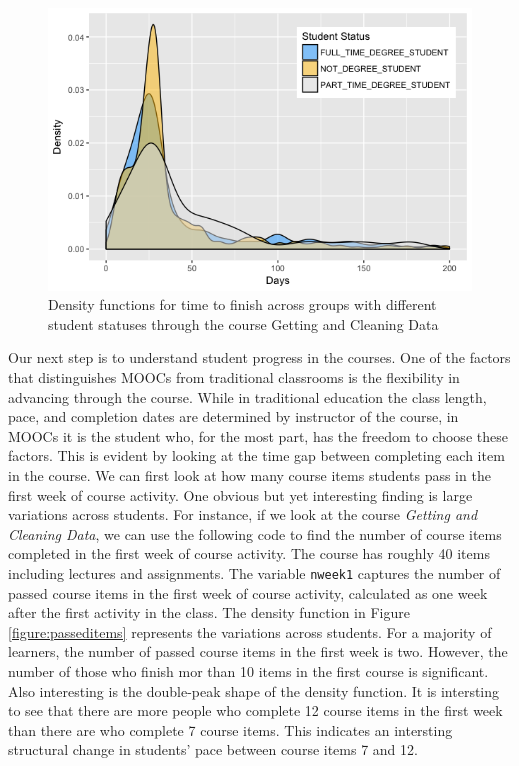 \begin{figure}[htbp]
    \centering
    \includegraphics[scale=0.5]{stustatus}
    \caption{Density functions for time to finish across groups with different student statuses through the course Getting and Cleaning Data}
    \label{figure:stustatus}
\end{figure}

Our next step is to understand student progress in the courses. One of
the factors that distinguishes MOOCs from traditional classrooms is the
flexibility in advancing through the course. While in traditional
education the class length, pace, and completion dates are determined by
instructor of the course, in MOOCs it is the student who, for the most
part, has the freedom to choose these factors. This is evident by
looking at the time gap between completing each item in the course. We
can first look at how many course items students pass in the first week
of course activity. One obvious but yet interesting finding is large
variations across students. For instance, if we look at the course
\emph{Getting and Cleaning Data}, we can use the following code to find
the number of course items completed in the first week of course
activity. The course has roughly 40 items including lectures and
assignments. The variable \texttt{nweek1} captures the number of passed
course items in the first week of course activity, calculated as one
week after the first activity in the class. The density function in
Figure \ref{figure:passeditems} represents the variations across
students. For a majority of learners, the number of passed course items
in the first week is two. However, the number of those who finish mor
than 10 items in the first course is significant. Also interesting is
the double-peak shape of the density function. It is intersting to see
that there are more people who complete 12 course items in the first
week than there are who complete 7 course items. This indicates an
intersting structural change in students' pace between course items 7
and 12.


